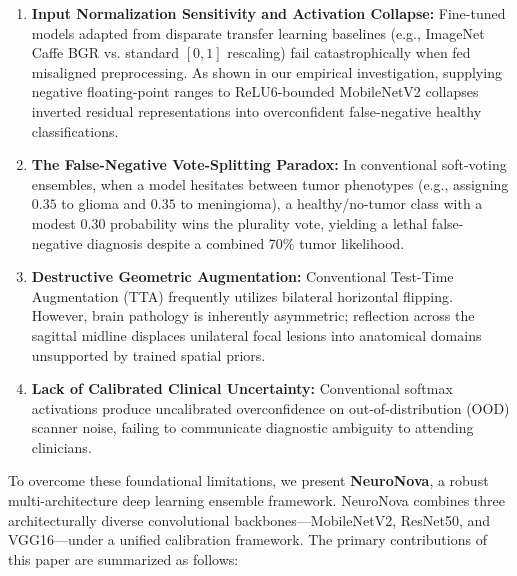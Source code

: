 \documentclass[runningheads]{llncs}
\begin{document}
\begin{enumerate}
    \item \textbf{Input Normalization Sensitivity and Activation Collapse:} Fine-tuned models adapted from disparate transfer learning baselines (e.g., ImageNet Caffe BGR vs. standard $[0, 1]$ rescaling) fail catastrophically when fed misaligned preprocessing. As shown in our empirical investigation, supplying negative floating-point ranges to ReLU6-bounded MobileNetV2 collapses inverted residual representations into overconfident false-negative healthy classifications.
    \item \textbf{The False-Negative Vote-Splitting Paradox:} In conventional soft-voting ensembles, when a model hesitates between tumor phenotypes (e.g., assigning $0.35$ to glioma and $0.35$ to meningioma), a healthy/no-tumor class with a modest $0.30$ probability wins the plurality vote, yielding a lethal false-negative diagnosis despite a combined 70\% tumor likelihood.
    \item \textbf{Destructive Geometric Augmentation:} Conventional Test-Time Augmentation (TTA) frequently utilizes bilateral horizontal flipping. However, brain pathology is inherently asymmetric; reflection across the sagittal midline displaces unilateral focal lesions into anatomical domains unsupported by trained spatial priors.
    \item \textbf{Lack of Calibrated Clinical Uncertainty:} Conventional softmax activations produce uncalibrated overconfidence on out-of-distribution (OOD) scanner noise, failing to communicate diagnostic ambiguity to attending clinicians.
\end{enumerate}

To overcome these foundational limitations, we present \textbf{NeuroNova}, a robust multi-architecture deep learning ensemble framework. NeuroNova combines three architecturally diverse convolutional backbones---MobileNetV2, ResNet50, and VGG16---under a unified calibration framework. The primary contributions of this paper are summarized as follows:
\end{document}
